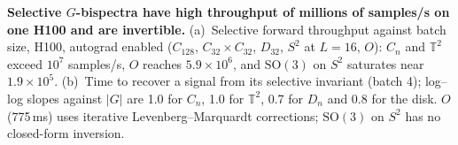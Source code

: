 \caption{\textbf{Selective $G$-bispectra have high throughput of millions of samples/s
    on one H100 and are invertible.}
    (a)~Selective forward throughput against batch size, H100, autograd enabled ($C_{128}$,
    $C_{32}{\times}C_{32}$, $D_{32}$, $S^2$ at $L{=}16$, $O$): $C_n$ and $\mathbb{T}^2$ exceed $10^7$ samples/s,
    $O$ reaches $5.9{\times}10^{6}$, and $\mathrm{SO}(3)$ on $S^2$ saturates near
    $1.9{\times}10^{5}$. (b)~Time to recover a signal from its selective invariant (batch
    4); log--log slopes against $|G|$ are 1.0 for $C_n$, 1.0 for $\mathbb{T}^2$, 0.7 for $D_n$ and 0.8 for the disk. $O$ (775\,ms) uses
    iterative Levenberg--Marquardt corrections; $\mathrm{SO}(3)$ on $S^2$ has no closed-form inversion.}
  \label{fig:gpu-scaling}
